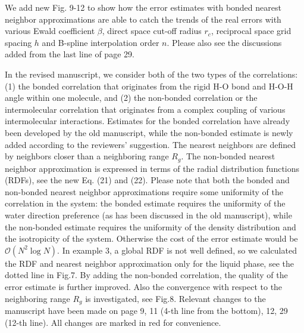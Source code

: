 \documentclass[a4paper]{article}
\begin{document}
We add new Fig. 9-12 to show how the error estimates
with bonded nearest neighbor approximations are able to catch the
trends of the real errors with various Ewald coefficient $\beta$, direct space
cut-off radius $r_c$, reciprocal space grid spacing $h$ and B-spline
interpolation order $n$.
Please also see the discussions added
from the last line of page 29.

In the revised manuscript,
we consider both of the two types of the correlations:
(1) the bonded correlation
that originates from the rigid H-O
bond and H-O-H angle within one molecule,
and (2) the
non-bonded correlation or the
intermolecular correlation that originates from
a complex coupling of various intermolecular interactions.
Estimates for the bonded correlation
have already been developed by the old manuscript,
while the non-bonded estimate
is newly added according to the reviewers' suggestion.
The nearest neighbors are defined by neighbors closer than
a neighboring range $R_g$.
The non-bonded nearest neighbor approximation 
is expressed in terms of the radial distribution
functions (RDFs), see the new Eq. (21) and (22).
Please note that
both the bonded and non-bonded nearest neighbor approximations
require some uniformity of the correlation in the system:
the bonded estimate requires the uniformity of the water
direction preference (as has been discussed in the old manuscript),
while the non-bonded estimate requires the uniformity
of the density distribution and the isotropicity of the system.
Otherwise the cost of the error estimate would be $\mathcal O(N^2\log N)$.
In example 3, a global RDF is not well defined,
so we calculated the RDF and nearest neighbor approximation
only for the liquid phase, see the dotted line in Fig.7. By adding
the non-bonded correlation, the quality of the error estimate
is further improved.
Also the convergence with respect to
the neighboring range $R_g$ is investigated, see Fig.8.
Relevant changes to the manuscript
have been made on page 9,
11 (4-th line from the bottom), 12, 29 (12-th line). All changes are marked 
in red for convenience.
\\
\end{document}

